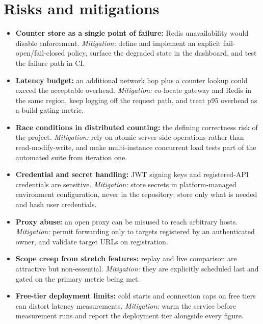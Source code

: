\documentclass[11pt,a4paper]{article}
\begin{document}
\section{Risks and mitigations}
\begin{itemize}[leftmargin=0.7cm]
    \item \textbf{Counter store as a single point of failure:} Redis
      unavailability would disable enforcement. \emph{Mitigation:} define and
      implement an explicit fail-open/fail-closed policy, surface the degraded
      state in the dashboard, and test the failure path in CI.
    \item \textbf{Latency budget:} an additional network hop plus a counter
      lookup could exceed the acceptable overhead. \emph{Mitigation:}
      co-locate gateway and Redis in the same region, keep logging off the
      request path, and treat p95 overhead as a build-gating metric.
    \item \textbf{Race conditions in distributed counting:} the defining
      correctness risk of the project. \emph{Mitigation:} rely on atomic
      server-side operations rather than read-modify-write, and make
      multi-instance concurrent load tests part of the automated suite from
      iteration one.
    \item \textbf{Credential and secret handling:} JWT signing keys and
      registered-API credentials are sensitive. \emph{Mitigation:} store
      secrets in platform-managed environment configuration, never in the
      repository; store only what is needed and hash user credentials.
    \item \textbf{Proxy abuse:} an open proxy can be misused to reach arbitrary
      hosts. \emph{Mitigation:} permit forwarding only to targets registered by
      an authenticated owner, and validate target URLs on registration.
    \item \textbf{Scope creep from stretch features:} replay and live
      comparison are attractive but non-essential. \emph{Mitigation:} they are
      explicitly scheduled last and gated on the primary metric being met.
    \item \textbf{Free-tier deployment limits:} cold starts and connection
      caps on free tiers can distort latency measurements.
      \emph{Mitigation:} warm the service before measurement runs and report
      the deployment tier alongside every figure.
\end{itemize}
\end{document}
